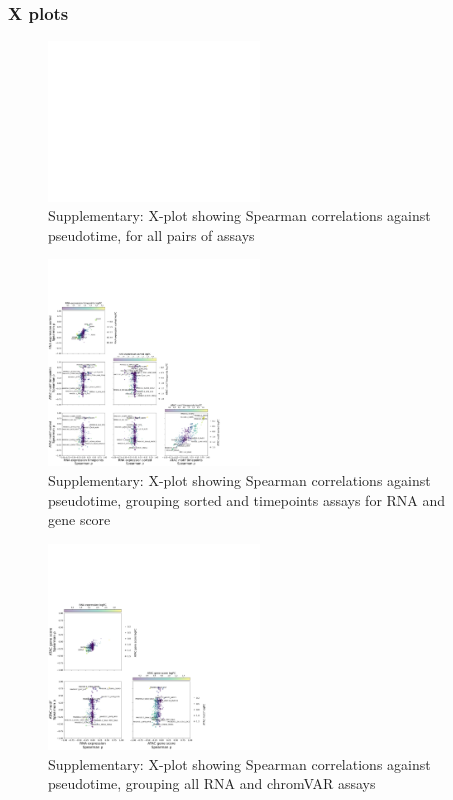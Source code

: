 \documentclass[a4paper]{article}
\begin{document}
\FloatBarrier
\subsubsection{X plots}
 
\begin{figure}[!htb]
  \centering
  \includegraphics[width=0.5\textwidth]{../figures/hematopoiesis/Monocyte_40_15_smooth_none_detailed_X_plot.png}
  \caption{Supplementary: X-plot showing Spearman correlations against pseudotime, for all pairs of assays}
\end{figure}

\begin{figure}[!htb]
  \centering
  \includegraphics[width=0.5\textwidth]{../figures/hematopoiesis/Monocyte_40_15_smooth_none_semi_detailed_X_plot.png}
  \caption{Supplementary: X-plot showing Spearman correlations against pseudotime, grouping sorted and timepoints assays for RNA and gene score}
\end{figure}

\begin{figure}[!htb]
  \centering
  \includegraphics[width=0.5\textwidth]{../figures/hematopoiesis/Monocyte_40_15_smooth_none_grouped_X_plot.png}
  \caption{Supplementary: X-plot showing Spearman correlations against pseudotime, grouping all RNA and chromVAR assays}
\end{figure}
\end{document}
